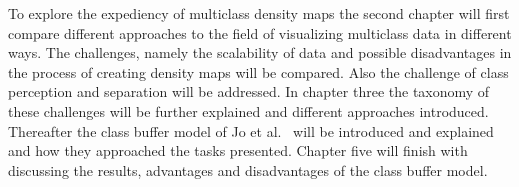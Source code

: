 To explore the expediency of multiclass density maps the second chapter will first compare different approaches to the field of visualizing multiclass data in different ways. The challenges, namely the scalability of data and possible disadvantages in the process of creating density maps will be compared. Also the challenge of class perception and separation will be addressed. In chapter three the taxonomy of these challenges will be further explained and different approaches introduced. Thereafter the class buffer model of Jo et al.~\cite{jo2019declarative} will be introduced and explained and how they approached the tasks presented. Chapter five will finish with discussing the results, advantages and disadvantages of the class buffer model.
